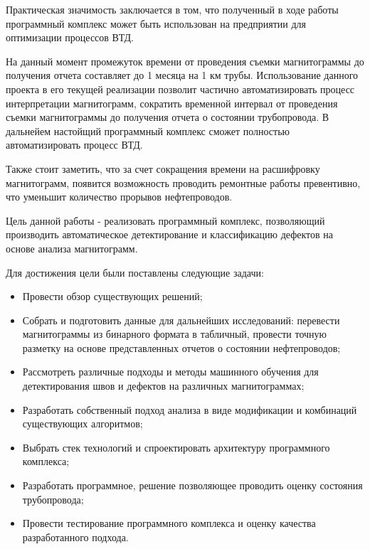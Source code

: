 \documentclass[a4paper,article,14pt]{extarticle}
\begin{document}
Практическая значимость заключается в том, что полученный в ходе работы программный комплекс может быть 
использован на предприятии для оптимизации процессов ВТД. 

На данный момент промежуток времени от проведения съемки магнитограммы до получения отчета составляет 
до 1 месяца на 1 км трубы. Использование данного проекта в его текущей реализации позволит частично 
автоматизировать процесс интерпретации магнитограмм, сократить временной интервал от проведения 
съемки магнитограммы до получения отчета о состоянии трубопровода. 
В дальнейем настойщий программный комплекс сможет полностью автоматизировать процесс ВТД.

Также стоит заметить, что за счет сокращения времени на расшифровку магнитограмм, появится возможность 
проводить ремонтные работы превентивно, что уменьшит количество прорывов нефтепроводов.

\pagebreak



Цель данной работы - реализовать программный комплекс, позволяющий производить автоматическое детектирование и классификацию дефектов на основе анализа магнитограмм. 


Для достижения цели были поставлены следующие задачи:

\begin{itemize}
    \item Провести обзор существующих решений;
    \item Собрать и подготовить данные для дальнейших исследований: перевести магнитограммы из бинарного формата в табличный, 
    провести точную разметку на основе представленных отчетов о состоянии нефтепроводов;
    \item Рассмотреть различные подходы и методы машинного обучения для детектирования швов и дефектов на различных магнитограммах;
    \item Разработать собственный подход анализа в виде модификации и комбинаций существующих алгоритмов;
    \item Выбрать стек технологий и спроектировать архитектуру программного комплекса;
    \item Разработать программное, решение позволяющее проводить оценку состояния трубопровода;
    \item Провести тестирование программного комплекса и оценку качества разработанного подхода.
\end{itemize}
\end{document}
